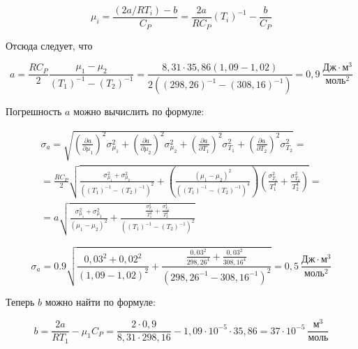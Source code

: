 \documentclass[a4paper,12pt]{article}
\begin{document}
\begin{equation}
    \mu_i = \frac{(2a/RT_i) - b}{C_P} = \frac{2a}{R C_P} \left( T_i \right)^{-1} - \frac{b}{C_P}
\end{equation}

Отсюда следует, что

\begin{equation}
    a = \frac{R C_P}{2} \frac{\mu_1 - \mu_2}{\left( T_1 \right)^{-1} - \left( T_2 \right)^{-1}} = \frac{8,31 \cdot 35,86(1,09 - 1,02)}{2 ((298,26)^{-1} - (308,16)^{-1})} = 0,9 \ \frac{\text{Дж} \cdot \text{м}^3}{\text{моль}^2}
\end{equation}

Погрешность $a$ можно вычислить по формуле:

\begin{multline*}
    \sigma_a = \sqrt{
    \left ( \frac{\partial a}{\partial \mu_1} \right )^2 \sigma_{\mu_1} ^ 2 +
    \left ( \frac{\partial a}{\partial \mu_2} \right )^2 \sigma_{\mu_2} ^ 2 +
    \left ( \frac{\partial a}{\partial T_1} \right )^2 \sigma_{T_1} ^ 2 +
    \left ( \frac{\partial a}{\partial T_2} \right )^2 \sigma_{T_2} ^ 2
    } = \\
    = \frac{R C_P}{2} \sqrt{
    \frac{\sigma_{\mu_1}^2 + \sigma_{\mu_2}^2}{\left( \left( T_1 \right)^{-1} - \left( T_2 \right)^{-1} \right)^2} + 
    \left( 
    \frac{\left( \mu_1 - \mu_2 \right)^2}{\left( \left( T_1 \right)^{-1} - \left( T_2 \right)^{-1} \right)^4}
    \right) \left( \frac{\sigma_{T_1}^2}{T_1^4} + \frac{\sigma_{T_2}^2}{T_2^4}\right)
    } = \\
    = a \sqrt{
    \frac{\sigma_{\mu_1}^2 + \sigma_{\mu_2}^2}{\left( \mu_1 - \mu_2 \right)^2} + 
    \frac{\frac{\sigma_{T_1}^2}{T_1^4} + \frac{\sigma_{T_2}^2}{T_2^4}}{\left( \left( T_1 \right)^{-1} - \left( T_2 \right)^{-1} \right)^2}
    }
\end{multline*}

\begin{equation}
    \sigma_a = 0.9 \sqrt{
    \frac{0,03^2 + 0,02^2}{\left( 1,09 - 1,02 \right)^2} + 
    \frac{\frac{0,03^2}{298,26^4} + \frac{0,03^2}{308,16^4}}{\left( 298,26^{-1} - 308,16^{-1} \right)^2}
    } = 0,5 \ \frac{\text{Дж} \cdot \text{м}^3}{\text{моль}^2}
\end{equation}

Теперь $b$ можно найти по формуле:

\begin{equation}
    b = \frac{2a}{R T_1} - \mu_1 C_P = \frac{2 \cdot 0,9}{8,31 \cdot 298,16} - 1,09 \cdot 10^{-5} \cdot 35,86 = 37 \cdot 10^{-5} \ \frac{\text{м}^3}{\text{моль}}
\end{equation}
\end{document}
